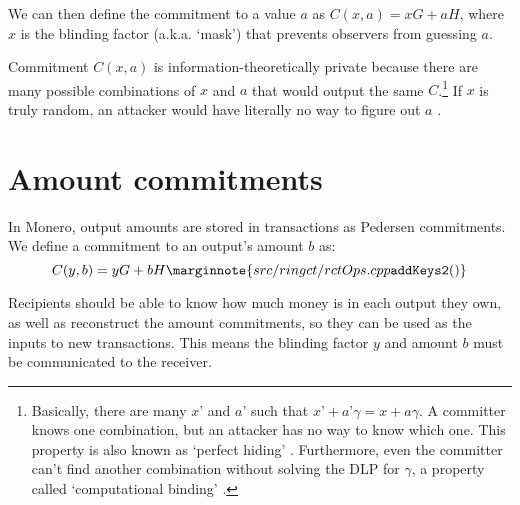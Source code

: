 We can then define the commitment to a value \(a\) as \(C(x, a) = x G + a H\), where \(x\) is the blinding factor (a.k.a. `mask') that prevents observers from guessing $a$.

Commitment $C(x, a)$ is information-theoretically private because there are many possible combinations of $x$ and $a$ that would output the same $C$.\footnote{Basically, there are many $x’$ and $a’$ such that $x’+a’ \gamma = x+a \gamma$. A committer knows one combination, but an attacker has no way to know which one. This property is also known as `perfect hiding' \cite{adam-zero-to-bulletproofs}. Furthermore, even the committer can't find another combination without solving the DLP for $\gamma$, a property called `computational binding' \cite{adam-zero-to-bulletproofs}.} If $x$ is truly random, an attacker would have literally no way to figure out $a$ \cite{maxwell-ct, SCOZZAFAVA1993313}.%



\section{Amount commitments}
\label{sec:pedersen_monero}

In Monero, output amounts are stored in transactions as Pedersen commitments. We define a commitment to an output’s amount $b$ as:\vspace{.175cm}
\[C(y,b) = y G + b H\marginnote{src/ringct/ rctOps.cpp {\tt addKeys2()}}\]

Recipients should be able to know how much money is in each output they own, as well as reconstruct the amount commitments, so they can be used as the inputs to new transactions. This means the blinding factor $y$ and amount $b$ must be communicated to the receiver.

